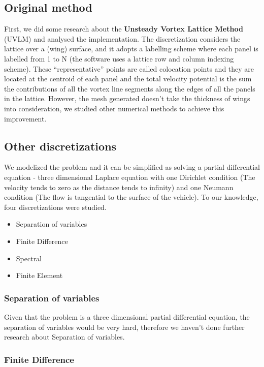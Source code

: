 \documentclass[a4paper, 11pt, article]{report}
\begin{document}
\subsection{Original method}

First, we did some research about the \textbf{Unsteady Vortex Lattice Method} (UVLM) and analysed the implementation. The discretization considers the lattice over a (wing) surface, and it adopts a labelling scheme where each panel is labelled from 1 to N (the software uses a lattice row and column indexing scheme). These “representative” points are called colocation points and they are located at the centroid of each panel and the total velocity potential is the sum the contributions of all the vortex line segments along the edges of all the panels in the lattice. However, the mesh generated doesn't take the thickness of wings into consideration, we studied other numerical methods to achieve this improvement.

\subsection{Other discretizations}

We modelized the problem and it can be simplified as solving a partial differential equation - three dimensional Laplace equation with one Dirichlet condition (The velocity tends to zero as the distance tends to infinity) and one Neumann condition (The flow is tangential to the surface of the vehicle). To our knowledge, four discretizations were studied.
\begin{itemize}
\item Separation of variables
\item Finite Difference
\item Spectral
\item Finite Element
\end{itemize}

\subsubsection{Separation of variables}

Given that the problem is a three dimensional partial differential equation, the separation of variables would be very hard, therefore we haven't done further research about Separation of variables.

\subsubsection{Finite Difference}
\end{document}
